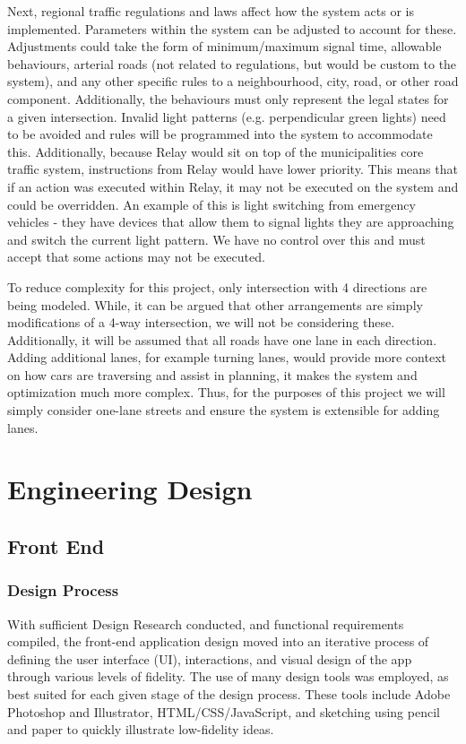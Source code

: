 \documentclass{report}
\begin{document}
Next, regional traffic regulations and laws affect how the system acts or is implemented.
Parameters within the system can be adjusted to account for these.
Adjustments could take the form of minimum/maximum signal time, allowable behaviours, arterial roads (not related to regulations, but would be custom to the system), and any other specific rules to a neighbourhood, city, road, or other road component.
Additionally, the behaviours must only represent the legal states for a given intersection.
Invalid light patterns (e.g. perpendicular green lights) need to be avoided and rules will be programmed into the system to accommodate this.
Additionally, because Relay would sit on top of the municipalities core traffic system, instructions from Relay would have lower priority.
This means that if an action was executed within Relay, it may not be executed on the system and could be overridden.
An example of this is light switching from emergency vehicles - they have devices that allow them to signal lights they are approaching and switch the current light pattern.
We have no control over this and must accept that some actions may not be executed.

To reduce complexity for this project, only intersection with 4 directions are being modeled. 
While, it can be argued that other arrangements are simply modifications of a 4-way intersection, we will not be considering these. 
Additionally, it will be assumed that all roads have one lane in each direction. 
Adding additional lanes, for example turning lanes, would provide more context on how cars are traversing and assist in planning, it makes the system and optimization much more complex. 
Thus, for the purposes of this project we will simply consider one-lane streets and ensure the system is extensible for adding lanes.


\newpage
\chapter{Engineering Design}

\section{Front End}

\subsection{Design Process}
With sufficient Design Research conducted, and functional requirements compiled, the front-end application design moved into an iterative process of defining the user interface (UI), interactions, and visual design of the app through various levels of fidelity.
The use of many design tools was employed, as best suited for each given stage of the design process. 
These tools include Adobe Photoshop and Illustrator, HTML/CSS/JavaScript, and sketching using pencil and paper to quickly illustrate low-fidelity ideas.
\end{document}
